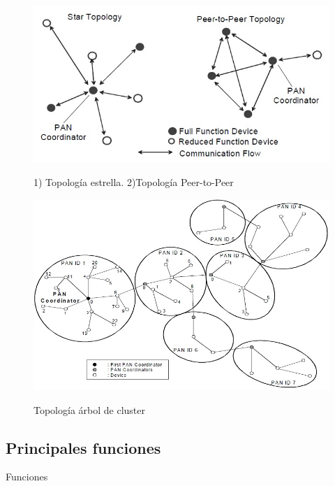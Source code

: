 \begin{figure}[h!]
	\centering
    \includegraphics[width=.8\textwidth]{./Figures/topologia.jpg}
	\label{fig:topo}
	\caption{1) Topología estrella. 2)Topología Peer-to-Peer}
\end{figure}

\begin{figure}[h!]
	\centering
    \includegraphics[width=.8\textwidth]{./Figures/cluster.jpg}
	\label{fig:clust}
	\caption{Topología árbol de cluster}
\end{figure}

\subsection{Principales funciones}

Funciones

